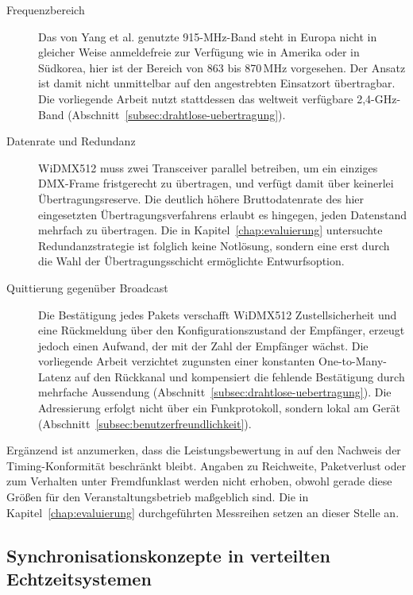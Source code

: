 \begin{description}
  \item[Frequenzbereich] Das von Yang et al. genutzte 915-MHz-Band steht in
    Europa nicht in gleicher Weise anmeldefreie zur Verfügung wie
    in Amerika oder in Südkorea, hier ist der Bereich von 863 bis
    870\,MHz vorgesehen. Der Ansatz ist damit nicht unmittelbar auf den
    angestrebten Einsatzort übertragbar. Die vorliegende Arbeit nutzt stattdessen
    das weltweit verfügbare 2,4-GHz-Band
    (Abschnitt~\ref{subsec:drahtlose-uebertragung}).
  \item[Datenrate und Redundanz] WiDMX512 muss zwei Transceiver parallel
    betreiben, um ein einziges DMX-Frame fristgerecht zu übertragen, und verfügt
    damit über keinerlei Übertragungsreserve. Die deutlich höhere Bruttodatenrate
    des hier eingesetzten Übertragungsverfahrens erlaubt es hingegen, jeden
    Datenstand mehrfach zu übertragen. Die in Kapitel~\ref{chap:evaluierung}
    untersuchte Redundanzstrategie ist folglich keine Notlösung, sondern eine
    erst durch die Wahl der Übertragungsschicht ermöglichte Entwurfsoption.
  \item[Quittierung gegenüber Broadcast] Die Bestätigung jedes Pakets verschafft
    WiDMX512 Zustellsicherheit und eine Rückmeldung über den Konfigurationszustand
    der Empfänger, erzeugt jedoch einen Aufwand, der mit der Zahl der Empfänger
    wächst. Die vorliegende Arbeit verzichtet zugunsten einer konstanten
    One-to-Many-Latenz auf den Rückkanal und kompensiert die fehlende Bestätigung
    durch mehrfache Aussendung
    (Abschnitt~\ref{subsec:drahtlose-uebertragung}). Die Adressierung erfolgt
    nicht über ein Funkprotokoll, sondern lokal am Gerät
    (Abschnitt~\ref{subsec:benutzerfreundlichkeit}).
\end{description}

Ergänzend ist anzumerken, dass die Leistungsbewertung in \cite{yang2015real} auf
den Nachweis der Timing-Konformität beschränkt bleibt. Angaben zu Reichweite,
Paketverlust oder zum Verhalten unter Fremdfunklast werden nicht erhoben, obwohl
gerade diese Größen für den Veranstaltungsbetrieb maßgeblich sind. Die in
Kapitel~\ref{chap:evaluierung} durchgeführten Messreihen setzen an dieser Stelle
an.

\subsection{Synchronisationskonzepte in verteilten Echtzeitsystemen}
\label{subsec:forschung-synchronisation}

